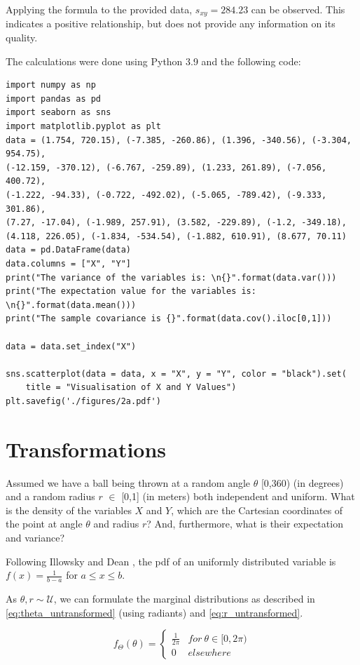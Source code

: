 Applying the formula to the provided data, $s_{xy} = 284.23$ can be observed. This indicates a positive relationship, but does not provide any information on its quality. 

The calculations were done using Python 3.9 and the following code:

\begin{verbatim}
import numpy as np
import pandas as pd
import seaborn as sns
import matplotlib.pyplot as plt
data = (1.754, 720.15), (-7.385, -260.86), (1.396, -340.56), (-3.304, 954.75),
(-12.159, -370.12), (-6.767, -259.89), (1.233, 261.89), (-7.056, 400.72), 
(-1.222, -94.33), (-0.722, -492.02), (-5.065, -789.42), (-9.333, 301.86),
(7.27, -17.04), (-1.989, 257.91), (3.582, -229.89), (-1.2, -349.18), 
(4.118, 226.05), (-1.834, -534.54), (-1.882, 610.91), (8.677, 70.11)
data = pd.DataFrame(data)
data.columns = ["X", "Y"]
print("The variance of the variables is: \n{}".format(data.var()))
print("The expectation value for the variables is: \n{}".format(data.mean()))
print("The sample covariance is {}".format(data.cov().iloc[0,1]))

data = data.set_index("X")

sns.scatterplot(data = data, x = "X", y = "Y", color = "black").set(
    title = "Visualisation of X and Y Values")
plt.savefig('./figures/2a.pdf')
\end{verbatim}


\section{Transformations}
Assumed we have a ball being thrown at a random angle $\theta$ [0,360) (in degrees) and a random radius $r$ $\in$ [0,1] (in meters) both independent and uniform. What is the density of the variables $X$ and $Y$, which are the Cartesian coordinates of the point at angle $\theta$ and radius $r$? And, furthermore, what is their expectation and variance?

Following Illowsky and Dean \cite[Chapter~5.2]{illowsky2018introductory}, the pdf of an uniformly distributed variable is $f(x) = \frac{1}{b-a}$ for $a \leq x \leq b$. 

As $\theta,r \sim \mathcal{U}$, we can formulate the marginal distributions as described in \ref{eq:theta_untransformed} (using radiants) and \ref{eq:r_untransformed}.

\begin{equation}
f_\Theta(\theta) = 
\begin{cases} 
      \frac{1}{2\pi} & for~\theta \in [0,2\pi)\\
      0&elsewhere
   \end{cases}
\label{eq:theta_untransformed}
\end{equation}

